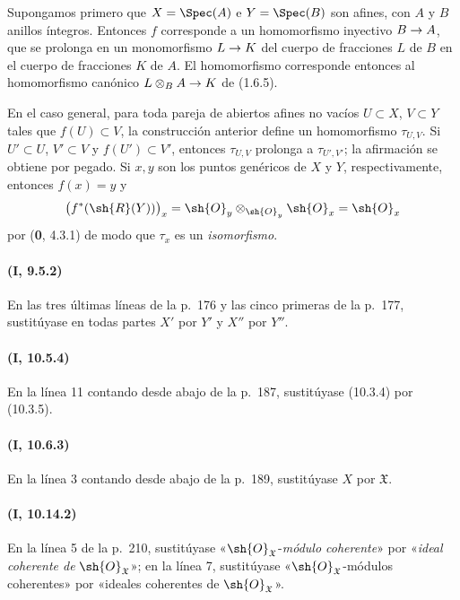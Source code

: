 \documentclass[oneside,10pt]{amsart}
\makeatletter
\newcommand{\ega@arrow}[2]{\mathchoice{#1}{#2}{#2}{#2}}
\renewcommand{\to}{\ega@arrow{\longrightarrow}{\rightarrow}}
\makeatother
\begin{document}
Supongamos primero que $X=\Spec(A)$ e $Y=\Spec(B)$ son afines, con
$A$ y $B$ anillos íntegros. Entonces $f$ corresponde a un homomorfismo
inyectivo $B\to A$, que se prolonga en un monomorfismo $L\to K$ del
cuerpo de fracciones $L$ de $B$ en el cuerpo de fracciones $K$ de $A$.
El homomorfismo  corresponde entonces al homomorfismo
canónico
$L\otimes_B A\to K$
de (1.6.5).

En el caso general, para toda pareja de abiertos afines no vacíos
$U\subset X$, $V\subset Y$ tales que $f(U)\subset V$, la construcción
anterior define un homomorfismo $\tau_{U,V}$. Si $U'\subset U$,
$V'\subset V$ y $f(U')\subset V'$, entonces $\tau_{U,V}$ prolonga a
$\tau_{U',V'}$; la afirmación se obtiene por pegado. Si $x,y$ son los
puntos genéricos de $X$ y $Y$, respectivamente, entonces $f(x)=y$ y
\[
  \bigl(f^*(\sh{R}(Y))\bigr)_x
  =\sh{O}_y\otimes_{\sh{O}_y}\sh{O}_x
  =\sh{O}_x
\]
por (\textbf 0, 4.3.1) de modo que $\tau_x$ es un \emph{isomorfismo}.

\paragraph{(I, 9.5.2)}
En las tres últimas líneas de la p.~176 y las cinco primeras de la
p.~177, sustitúyase en todas partes $X'$ por $Y'$ y $X''$ por $Y''$.

\paragraph{(I, 10.5.4)}
En la línea 11 contando desde abajo de la p.~187, sustitúyase (10.3.4)
por (10.3.5).

\paragraph{(I, 10.6.3)}
En la línea 3 contando desde abajo de la p.~189, sustitúyase $X$ por
$\mathfrak X$.

\paragraph{(I, 10.14.2)}
En la línea 5 de la p.~210, sustitúyase «$\sh{O}_{\mathfrak X}$-\emph{módulo
coherente}» por «\emph{ideal coherente de} $\sh{O}_{\mathfrak X}$»; en la
línea 7, sustitúyase «$\sh{O}_{\mathfrak X}$-módulos coherentes» por
«ideales coherentes de $\sh{O}_{\mathfrak X}$».
\end{document}
